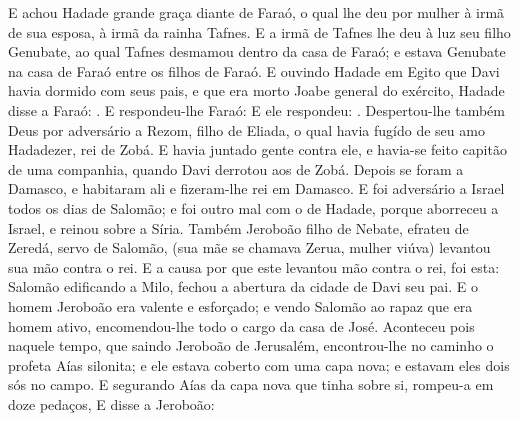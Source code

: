 {  E achou Hadade grande graça diante de Faraó, o qual lhe deu por mulher à irmã de sua esposa, à irmã da rainha Tafnes.
  E a irmã de Tafnes lhe deu à luz seu filho Genubate, ao qual Tafnes desmamou dentro da casa de Faraó; e estava Genubate na casa de Faraó entre os filhos de Faraó.
  E ouvindo Hadade em Egito que Davi havia dormido com seus pais, e que era morto Joabe general do exército, Hadade disse a Faraó: .
  E respondeu-lhe Faraó:  E ele respondeu: .
  Despertou-lhe também Deus por adversário a Rezom, filho de Eliada, o qual havia fugído de seu amo Hadadezer, rei de Zobá.
  E havia juntado gente contra ele, e havia-se feito capitão de uma companhia, quando Davi derrotou aos de Zobá. Depois se foram a Damasco, e habitaram ali e fizeram-lhe rei em Damasco.
  E foi adversário a Israel todos os dias de Salomão; e foi outro mal com o de Hadade, porque aborreceu a Israel, e reinou sobre a Síria.
  Também Jeroboão filho de Nebate, efrateu de Zeredá, servo de Salomão, (sua mãe se chamava Zerua, mulher viúva) levantou sua mão contra o rei.
  E a causa por que este levantou mão contra o rei, foi esta: Salomão edificando a Milo, fechou a abertura da cidade de Davi seu pai.
  E o homem Jeroboão era valente e esforçado; e vendo Salomão ao rapaz que era homem ativo, encomendou-lhe todo o cargo da casa de José.
  Aconteceu pois naquele tempo, que saindo Jeroboão de Jerusalém, encontrou-lhe no caminho o profeta Aías silonita; e ele estava coberto com uma capa nova; e estavam eles dois sós no campo.
  E segurando Aías da capa nova que tinha sobre si, rompeu-a em doze pedaços,
  E disse a Jeroboão: }

